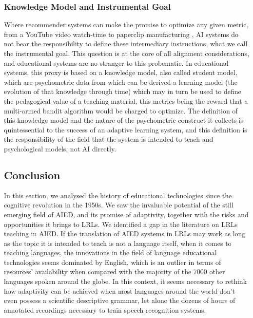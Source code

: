         \subsubsection{Knowledge Model and Instrumental Goal}
Where recommender systems can make the promise to optimize any given metric, from a YouTube video watch-time to paperclip manufacturing \parencite{bostrom_ethical_2003}, AI systems do not bear the responsibility to define these intermediary instructions, what we call the instrumental goal. This question is at the core of all alignment considerations, and educational systems are no stranger to this probematic. In educational systems, this proxy is based on a knowledge model, also called student model, which are psychometric data from which can be derived a learning model (the evolution of that knowledge through time) which may in turn be used to define the pedagogical value of a teaching material, this metrics being the reward that a multi-armed bandit algorithm would be charged to optimize. The definition of this knowledge model and the nature of the psychometric construct it collects is quintessential to the success of an adaptive learning system, and this definition is the responsibility of the field that the system is intended to teach and psychological models, not AI directly.

    \subsection{Conclusion}
In this section, we analysed the history of educational technologies since the cognitive revolution in the 1950s. We saw the invaluable potential of the still emerging field of AIED, and its promise of adaptivity, together with the risks and opportunities it brings to LRLs. We identified a gap in the literature on LRLs teaching in AIED. If the translation of AIED systems in LRLs may work as long as the topic it is intended to teach is not a language itself, when it comes to teaching languages, the innovations in the field of language educational technologies seems dominated by English, which is an outlier in terms of resources' availability when compared with the majority of the 7000 other languages spoken around the globe. In this context, it seems necessary to rethink how adaptivity can be achieved when most languages around the world don't even possess a scientific descriptive grammar, let alone the dozens of hours of annotated recordings necessary to train speech recognition systems.
